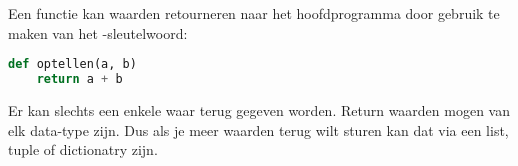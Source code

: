 Een functie kan waarden retourneren naar het hoofdprogramma door gebruik te maken van het -sleutelwoord:
\begin{lstlisting}[language=python]
def optellen(a, b)
    return a + b
\end{lstlisting}

Er kan slechts een enkele waar terug gegeven worden. Return waarden mogen van elk data-type zijn. Dus als je meer waarden terug wilt sturen kan dat via een list, tuple of dictionatry zijn.

